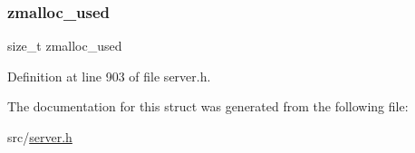 \subsubsection{\texorpdfstring{zmalloc\+\_\+used}{zmalloc\_used}}
{\footnotesize\ttfamily size\+\_\+t zmalloc\+\_\+used}



Definition at line 903 of file server.\+h.



The documentation for this struct was generated from the following file\+:\begin{DoxyCompactItemize}
\item 
src/\hyperlink{server_8h}{server.\+h}\end{DoxyCompactItemize}
